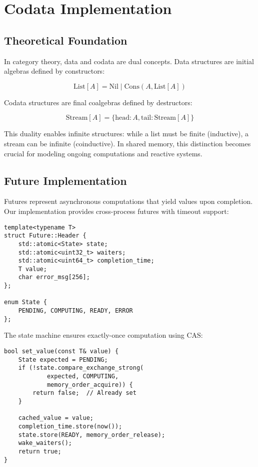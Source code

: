 \documentclass[10pt,conference]{IEEEtran}
\begin{document}
\section{Codata Implementation}

\subsection{Theoretical Foundation}

In category theory, data and codata are dual concepts. Data structures are initial algebras defined by constructors:

\begin{equation}
\text{List}[A] = \text{Nil} \mid \text{Cons}(A, \text{List}[A])
\end{equation}

Codata structures are final coalgebras defined by destructors:

\begin{equation}
\text{Stream}[A] = \{\text{head}: A, \text{tail}: \text{Stream}[A]\}
\end{equation}

This duality enables infinite structures: while a list must be finite (inductive), a stream can be infinite (coinductive). In shared memory, this distinction becomes crucial for modeling ongoing computations and reactive systems.

\subsection{Future Implementation}

Futures represent asynchronous computations that yield values upon completion. Our implementation provides cross-process futures with timeout support:

\begin{lstlisting}[caption={Future Structure},label={lst:future}]
template<typename T>
struct Future::Header {
    std::atomic<State> state;
    std::atomic<uint32_t> waiters;
    std::atomic<uint64_t> completion_time;
    T value;
    char error_msg[256];
};

enum State {
    PENDING, COMPUTING, READY, ERROR
};
\end{lstlisting}

The state machine ensures exactly-once computation using CAS:

\begin{lstlisting}[caption={Future Set Operation},label={lst:futureset}]
bool set_value(const T& value) {
    State expected = PENDING;
    if (!state.compare_exchange_strong(
            expected, COMPUTING,
            memory_order_acquire)) {
        return false;  // Already set
    }
    
    cached_value = value;
    completion_time.store(now());
    state.store(READY, memory_order_release);
    wake_waiters();
    return true;
}
\end{lstlisting}
\end{document}
